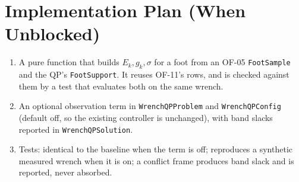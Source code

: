 \documentclass[11pt]{article}
\begin{document}
\section{Implementation Plan (When Unblocked)}

\begin{enumerate}
  \item A pure function that builds $E_k, g_k, \sigma$ for a foot from an
        OF-05 \texttt{FootSample} and the QP's \texttt{FootSupport}. It
        reuses OF-11's rows, and is checked against them by a test that
        evaluates both on the same wrench.
  \item An optional observation term in \texttt{WrenchQPProblem} and
        \texttt{WrenchQPConfig} (default off, so the existing controller is
        unchanged), with band slacks reported in \texttt{WrenchQPSolution}.
  \item Tests: identical to the baseline when the term is off; reproduces a
        synthetic measured wrench when it is on; a conflict frame produces
        band slack and is reported, never absorbed.
\end{enumerate}
\end{document}
